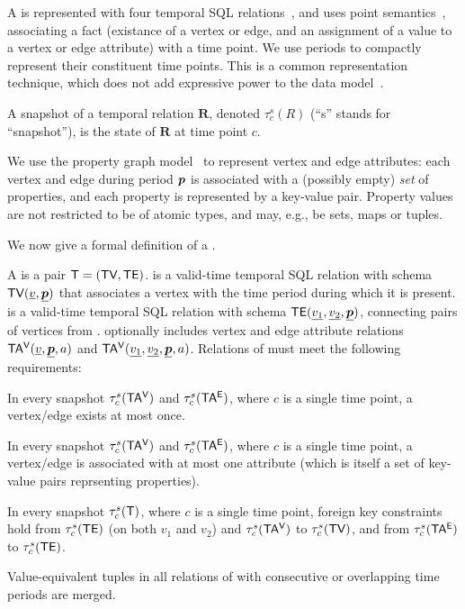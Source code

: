 A \tg is represented with four temporal SQL
relations~\cite{DBLP:conf/vldb/BohlenSS96}, and uses point
semantics~\cite{DBLP:reference/db/Toman09}, associating a fact
(existance of a vertex or edge, and an assignment of a value to a
vertex or edge attribute) with a time point.  We use periods to
compactly represent their constituent time points.  This is a common
representation technique, which does not add expressive power to the
data model~\cite{DBLP:conf/ictl/Chomicki94}.

A snapshot of a temporal relation $\mathbf{R}$, denoted $\tau^s_c(R)$
(``s'' stands for ``snapshot''), is the state of $\mathbf{R}$ at time
point $c$.

We use the property graph model~\cite{GraphDB} to represent vertex and
edge attributes: each vertex and edge during period $\boldsymbol{p}$ is
associated with a (possibly empty) {\em set} of properties, and each
property is represented by a key-value pair.  Property values are not
restricted to be of atomic types, and may, e.g., be sets, maps or
tuples.

We now give a formal definition of a \tg.

\begin{definition}[TGraph]
A \tg is a pair $\mathsf{T}=(\textsf{TV}, \textsf{TE})$. \tv is a valid-time temporal SQL
relation with schema $\textsf{TV}(\underline{v}, \underline{\boldsymbol{p}})$ that
associates a vertex with the time period during which it is
present. \te is a valid-time temporal SQL relation with schema
$\textsf{TE}(\underline{v_1}, \underline{v_2}, \underline{\boldsymbol{p}})$, connecting
pairs of vertices from \tv.  
%
\tve optionally includes vertex and edge attribute relations
$\mathsf{TA^{V}}(\underline{v}, \underline{\boldsymbol{p}}, a)$ and $\mathsf{TA^{V}}(\underline{v_1},
\underline{v_2}, \underline{\boldsymbol{p}}, a)$.  
%
Relations of \tve must meet the following requirements:

\begin{description}[noitemsep]

\item [R1: Unique vertices/ edges] In every snapshot $\tau^s_c
  (\mathsf{TA^{V}})$ and $\tau^s_c (\mathsf{TA^{E}})$, where $c$ is a single time point, a
  vertex/edge exists at most once.

\item [R2: Unique attribute values] In every snapshot $\tau^s_c
  (\mathsf{TA^{V}})$ and $\tau^s_c (\mathsf{TA^{E}})$, where $c$ is a single time point, a
  vertex/edge is associated with at most one attribute (which is
  itself a set of key-value pairs reprsenting properties).

\item [R3: Referential integrity] In every snapshot $\tau^s_c (\mathsf{T})$,
  where $c$ is a single time point, foreign key constraints hold from
  $\tau^s_c (\textsf{TE})$ (on both $v_1$ and $v_2$) and $\tau^s_c (\mathsf{TA^{V}})$ to
  $\tau^s_c (\textsf{TV})$, and from $\tau^s_c (\mathsf{TA^{E}})$ to $\tau^s_c (\textsf{TE})$.

\item [R4: Coalesced] Value-equivalent tuples in all relations of \tve
  with consecutive or overlapping time periods are merged.  

\end{description}
\label{def:tg}
\end{definition}

